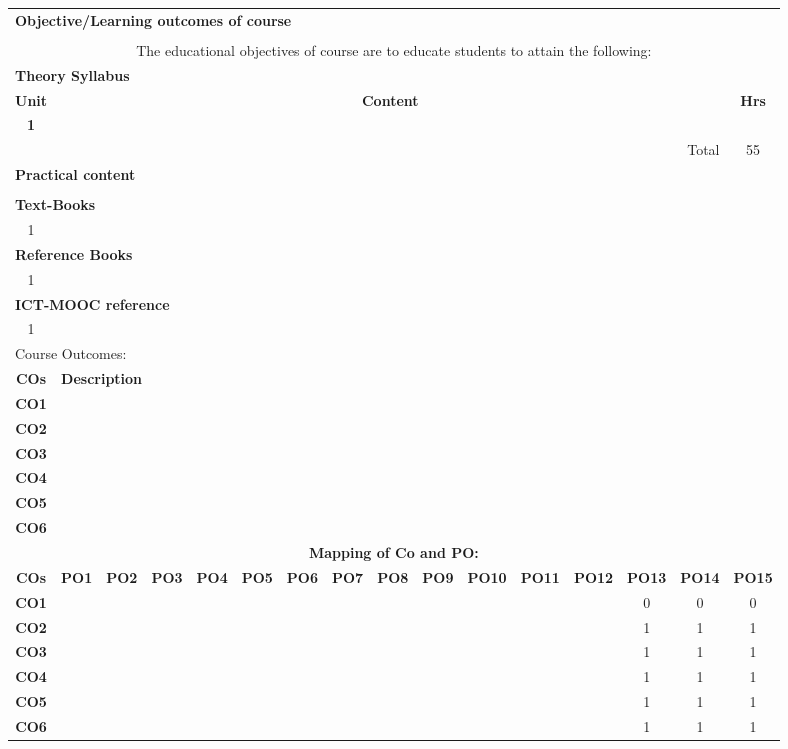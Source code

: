 \documentclass[a4paper]{article}%
\begin{document}
\begin{longtable}{|c|c|c|c|c|c|c|c|c|c|c|c|c|c|c|c|}
\hline%
\multicolumn{16}{|l|}{\textbf{Objective/Learning outcomes of course}%
\cellcolor{black!30}}\\%
\multicolumn{16}{|l|}{\textbf{}}\\%
\hline%
\multicolumn{16}{|p{15cm}|}{The educational objectives of course are to educate students to attain the following:}\\%
\hline%
\multicolumn{16}{|l|}{\textbf{Theory Syllabus}%
\cellcolor{black!30}}\\%
\hline%
\textbf{Unit}&\multicolumn{14}{c|}{\textbf{Content}}&\textbf{Hrs}\\%
\hline%
\textbf{1}&\multicolumn{14}{|p{14cm}|}{}&\textbf{}\\%
\hline%
\multicolumn{15}{|r|}{Total}&55\\%
\hline%
\multicolumn{16}{|l|}{\textbf{Practical content}%
\cellcolor{black!30}}\\%
\multicolumn{16}{|l|}{\textbf{}}\\%
\hline%
\multicolumn{16}{|l|}{\textbf{Text{-}Books}%
\cellcolor{black!30}}\\%
\hline%
1&\multicolumn{15}{|p{15cm}|}{}\\%
\hline%
\multicolumn{16}{|l|}{\textbf{Reference Books}%
\cellcolor{black!30}}\\%
\hline%
1&\multicolumn{15}{|p{15cm}|}{}\\%
\hline%
\multicolumn{16}{|l|}{\textbf{ICT{-}MOOC reference}%
\cellcolor{black!30}}\\%
\hline%
1&\multicolumn{15}{|p{15cm}|}{}\\%
\hline%
\multicolumn{16}{|l|}{Course Outcomes:%
\cellcolor{black!30}}\\%
\hline%
\textbf{COs}&\multicolumn{15}{|l|}{\textbf{Description}}\\%
\hline%
\textbf{CO1}&\multicolumn{15}{|p{15cm}|}{}\\%
\hline%
\textbf{CO2}&\multicolumn{15}{|p{15cm}|}{}\\%
\hline%
\textbf{CO3}&\multicolumn{15}{|p{15cm}|}{}\\%
\hline%
\textbf{CO4}&\multicolumn{15}{|p{15cm}|}{}\\%
\hline%
\textbf{CO5}&\multicolumn{15}{|p{15cm}|}{}\\%
\hline%
\textbf{CO6}&\multicolumn{15}{|p{15cm}|}{}\\%
\hline%
\multicolumn{16}{|c|}{\textbf{Mapping of Co and PO:}}\\%
\hline%
\textbf{COs}&\textbf{PO1}&\textbf{PO2}&\textbf{PO3}&\textbf{PO4}&\textbf{PO5}&\textbf{PO6}&\textbf{PO7}&\textbf{PO8}&\textbf{PO9}&\textbf{PO10}&\textbf{PO11}&\textbf{PO12}&\textbf{PO13}&\textbf{PO14}&\textbf{PO15}\\%
\hline%
\textbf{CO1}&&&&&&&&&&&&&0&0&0\\%
\hline%
\textbf{CO2}&&&&&&&&&&&&&1&1&1\\%
\hline%
\textbf{CO3}&&&&&&&&&&&&&1&1&1\\%
\hline%
\textbf{CO4}&&&&&&&&&&&&&1&1&1\\%
\hline%
\textbf{CO5}&&&&&&&&&&&&&1&1&1\\%
\hline%
\textbf{CO6}&&&&&&&&&&&&&1&1&1\\%
\hline%
\end{longtable}%
\end{document}
